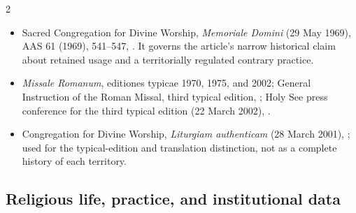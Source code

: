 \begin{multicols}{2}
{\begin{itemize}[itemsep=0.1em,topsep=0.15em]
\item Sacred Congregation for Divine Worship, \emph{Memoriale Domini} (29 May 1969), AAS 61 (1969), 541--547, . It governs the article's narrow historical claim about retained usage and a territorially regulated contrary practice.
\item \emph{Missale Romanum}, editiones typicae 1970, 1975, and 2002; General Instruction of the Roman Missal, third typical edition, ; Holy See press conference for the third typical edition (22 March 2002), .
\item Congregation for Divine Worship, \emph{Liturgiam authenticam} (28 March 2001), ; used for the typical-edition and translation distinction, not as a complete history of each territory.
\end{itemize}}

\subsection*{Religious life, practice, and institutional data}


\end{multicols}
